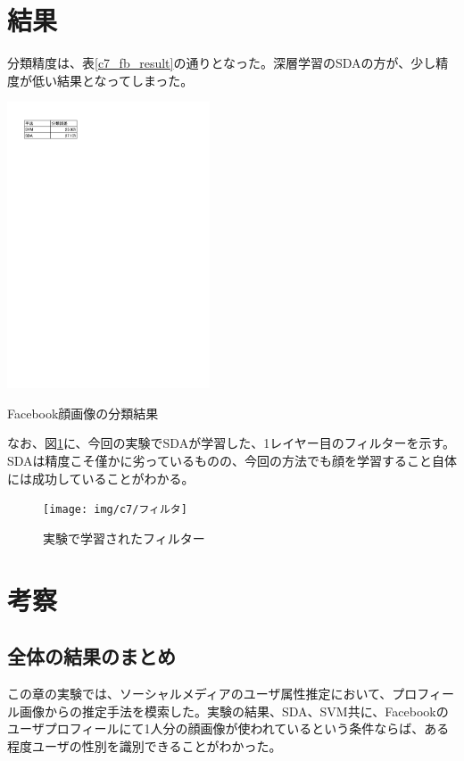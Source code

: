 \section{結果}
分類精度は、表\ref{c7_fb_result}の通りとなった。深層学習のSDAの方が、少し精度が低い結果となってしまった。\par
\begin{table}[tbp]
 \begin{center}
  \includegraphics[width=60mm]{img/c7/fb_result}
 \end{center}
 \caption{Facebook顔画像の分類結果}
 \label{c7_fb_result}
\end{table}
なお、図\ref{c7_フィルタ}に、今回の実験でSDAが学習した、1レイヤー目のフィルターを示す。SDAは精度こそ僅かに劣っているものの、今回の方法でも顔を学習すること自体には成功していることがわかる。

\begin{figure}[tbp]
 \begin{center}
  \texttt{[image: img/c7/フィルタ]}
 \end{center}
 \caption{実験で学習されたフィルター}
 \label{c7_フィルタ}
\end{figure}

\section{考察}
\subsection{全体の結果のまとめ}
この章の実験では、ソーシャルメディアのユーザ属性推定において、プロフィール画像からの推定手法を模索した。実験の結果、SDA、SVM共に、Facebookのユーザプロフィールにて1人分の顔画像が使われているという条件ならば、ある程度ユーザの性別を識別できることがわかった。\par
